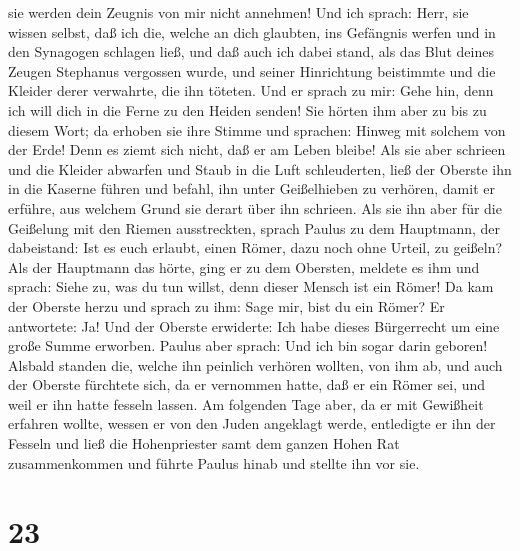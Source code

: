 sie werden dein Zeugnis von mir nicht annehmen!  Und ich
sprach: Herr, sie wissen selbst, daß ich die, welche an dich glaubten,
ins Gefängnis werfen und in den Synagogen schlagen ließ, 
und daß auch ich dabei stand, als das Blut deines Zeugen Stephanus
vergossen wurde, und seiner Hinrichtung beistimmte und die Kleider derer
verwahrte, die ihn töteten.  Und er sprach zu mir: Gehe
hin, denn ich will dich in die Ferne zu den Heiden senden!
 Sie hörten ihm aber zu bis zu diesem Wort; da erhoben
sie ihre Stimme und sprachen: Hinweg mit solchem von der Erde! Denn es
ziemt sich nicht, daß er am Leben bleibe!  Als sie aber
schrieen und die Kleider abwarfen und Staub in die Luft schleuderten,
 ließ der Oberste ihn in die Kaserne führen und befahl,
ihn unter Geißelhieben zu verhören, damit er erführe, aus welchem Grund
sie derart über ihn schrieen.  Als sie ihn aber für die
Geißelung mit den Riemen ausstreckten, sprach Paulus zu dem Hauptmann,
der dabeistand: Ist es euch erlaubt, einen Römer, dazu noch ohne Urteil,
zu geißeln?  Als der Hauptmann das hörte, ging er zu dem
Obersten, meldete es ihm und sprach: Siehe zu, was du tun willst, denn
dieser Mensch ist ein Römer!  Da kam der Oberste herzu
und sprach zu ihm: Sage mir, bist du ein Römer? Er antwortete: Ja!
 Und der Oberste erwiderte: Ich habe dieses Bürgerrecht
um eine große Summe erworben. Paulus aber sprach: Und ich bin sogar
darin geboren!  Alsbald standen die, welche ihn peinlich
verhören wollten, von ihm ab, und auch der Oberste fürchtete sich, da er
vernommen hatte, daß er ein Römer sei, und weil er ihn hatte fesseln
lassen.  Am folgenden Tage aber, da er mit Gewißheit
erfahren wollte, wessen er von den Juden angeklagt werde, entledigte er
ihn der Fesseln und ließ die Hohenpriester samt dem ganzen Hohen Rat
zusammenkommen und führte Paulus hinab und stellte ihn vor sie.

\hypertarget{section-22}{%
\section{23}\label{section-22}}

